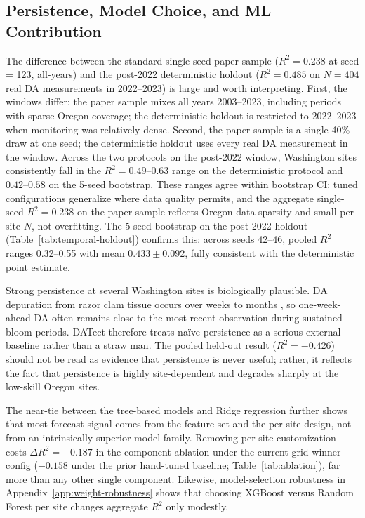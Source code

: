 \documentclass[toxins,article,submit,moreauthors]{Definitions/mdpi}
\begin{document}
\subsection{Persistence, Model Choice, and ML Contribution}

The difference between the standard single-seed paper sample ($R^2 = 0.238$ at seed = 123, all-years) and the post-2022 deterministic holdout ($R^2 = 0.485$ on $N = 404$ real DA measurements in 2022--2023) is large and worth interpreting. First, the windows differ: the paper sample mixes all years 2003--2023, including periods with sparse Oregon coverage; the deterministic holdout is restricted to 2022--2023 when monitoring was relatively dense. Second, the paper sample is a single 40\% draw at one seed; the deterministic holdout uses every real DA measurement in the window. Across the two protocols on the post-2022 window, Washington sites consistently fall in the $R^2 = 0.49$--$0.63$ range on the deterministic protocol and $0.42$--$0.58$ on the 5-seed bootstrap. These ranges agree within bootstrap CI: tuned configurations generalize where data quality permits, and the aggregate single-seed $R^2 = 0.238$ on the paper sample reflects Oregon data sparsity and small-per-site $N$, not overfitting. The 5-seed bootstrap on the post-2022 holdout (Table~\ref{tab:temporal-holdout}) confirms this: across seeds 42--46, pooled $R^2$ ranges 0.32--0.55 with mean $0.433 \pm 0.092$, fully consistent with the deterministic point estimate.

Strong persistence at several Washington sites is biologically plausible. DA depuration from razor clam tissue occurs over weeks to months \cite{Drum1993, Wekell1994}, so one-week-ahead DA often remains close to the most recent observation during sustained bloom periods. DATect therefore treats na\"ive persistence as a serious external baseline rather than a straw man. The pooled held-out result ($R^2 = -0.426$) should not be read as evidence that persistence is never useful; rather, it reflects the fact that persistence is highly site-dependent and degrades sharply at the low-skill Oregon sites.

The near-tie between the tree-based models and Ridge regression further shows that most forecast signal comes from the feature set and the per-site design, not from an intrinsically superior model family. Removing per-site customization costs $\Delta R^2 = -0.187$ in the component ablation under the current grid-winner config ($-0.158$ under the prior hand-tuned baseline; Table~\ref{tab:ablation}), far more than any other single component. Likewise, model-selection robustness in Appendix~\ref{app:weight-robustness} shows that choosing XGBoost versus Random Forest per site changes aggregate $R^2$ only modestly.
\end{document}
